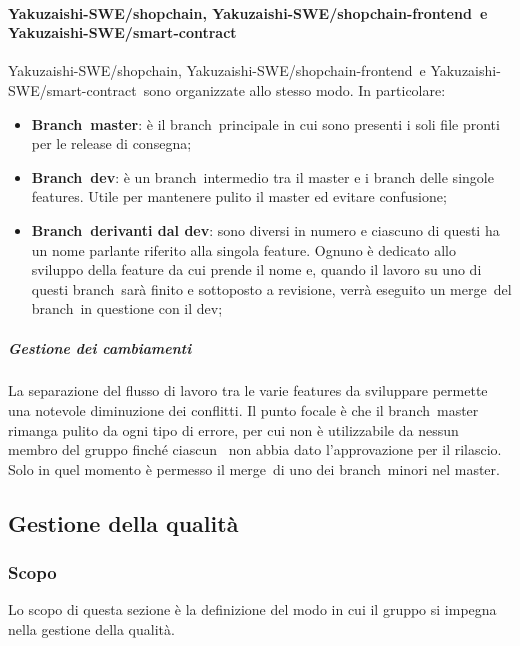         \paragraph{Yakuzaishi-SWE/shopchain, Yakuzaishi-SWE/shopchain-frontend\glo\ e Yakuzaishi-SWE/smart-contract\glo}
        Yakuzaishi-SWE/shopchain, Yakuzaishi-SWE/shopchain-frontend\glo\ e Yakuzaishi-SWE/smart-contract\glo\ sono organizzate allo stesso modo. In particolare:
        \begin{itemize}
            \item \textbf{Branch\glo\ master}: è il branch\glo\ principale in cui sono presenti i soli file pronti per le release di consegna;
            \item \textbf{Branch\glo\ dev}: è un branch\glo\ intermedio tra il master e i branch delle singole features. Utile per mantenere pulito il master ed evitare confusione;
            \item \textbf{Branch\glo\ derivanti dal dev}: sono diversi in numero e ciascuno di questi ha un nome parlante riferito alla singola feature. Ognuno è dedicato allo sviluppo della feature da cui prende il nome e, quando il lavoro su uno di questi branch\glo\ sarà finito e sottoposto a revisione, verrà eseguito un merge\glo\ del branch\glo\ in questione con il dev;
        \end{itemize}

        \subparagraph{Gestione dei cambiamenti}
        La separazione del flusso di lavoro tra le varie features da sviluppare permette una notevole diminuzione dei conflitti. Il punto focale è che il branch\glo\ master rimanga pulito da ogni tipo di errore, per cui non è utilizzabile da nessun membro del gruppo finché ciascun \roleProjectManagerLow\ non abbia dato l’approvazione per il rilascio. Solo in quel momento è permesso il merge\glo\ di uno dei branch\glo\ minori nel master.

\vspace{2cm}

\subsection{Gestione della qualità}\label{subsection: gestione_qualita}
\subsubsection{Scopo}
Lo scopo di questa sezione è la definizione del modo in cui il gruppo si impegna nella gestione della qualità.
